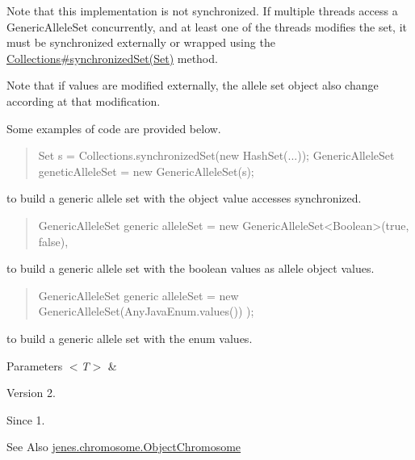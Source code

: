 Note that this implementation is not synchronized. If multiple threads access a Generic\-Allele\-Set concurrently, and at least one of the threads modifies the set, it must be synchronized externally or wrapped using the \hyperlink{}{Collections\#synchronized\-Set(\-Set)} method. 

Note that if values are modified externally, the allele set object also change according at that modification. 

Some examples of code are provided below. 

\begin{quotation}

\begin{DoxyPre}
   Set s = Collections.synchronizedSet(new HashSet(...));
   GenericAlleleSet geneticAlleleSet = new GenericAlleleSet(s);
\end{DoxyPre}
\end{quotation}
to build a generic allele set with the object value accesses synchronized. 

\begin{quotation}

\begin{DoxyPre}
   GenericAlleleSet generic alleleSet = new GenericAlleleSet<Boolean>(true, false),
\end{DoxyPre}
\end{quotation}
to build a generic allele set with the boolean values as allele object values. 

\begin{quotation}

\begin{DoxyPre}
   GenericAlleleSet generic alleleSet = new GenericAlleleSet(AnyJavaEnum.values()) );
\end{DoxyPre}
\end{quotation}
to build a generic allele set with the enum values. 


\begin{DoxyParams}{Parameters}
{\em $<$\-T$>$} & \\
\hline
\end{DoxyParams}
\begin{DoxyVersion}{Version}
2. 
\end{DoxyVersion}
\begin{DoxySince}{Since}
1.
\end{DoxySince}
\begin{DoxySeeAlso}{See Also}
\hyperlink{classjenes_1_1chromosome_1_1_object_chromosome}{jenes.\-chromosome.\-Object\-Chromosome} 
\end{DoxySeeAlso}


